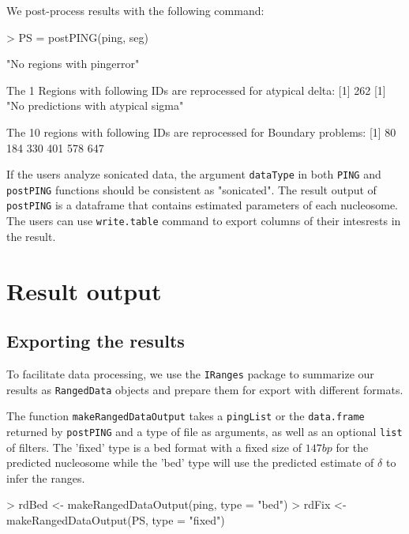 \documentclass[11pt]{article}
\begin{document}
We post-process results with the following command:


\begin{Schunk}
\begin{Sinput}
> PS = postPING(ping, seg)
\end{Sinput}
\begin{Soutput}
[1] "No regions with pingerror"

 The 1 Regions with following IDs are reprocessed for atypical delta: 
[1] 262
[1] "No predictions with atypical sigma"

 The 10 regions with following IDs are reprocessed for Boundary problems: 
[1]  80 184 330 401 578 647
\end{Soutput}
\end{Schunk}
If the users analyze sonicated data, the argument \texttt{dataType} in both \texttt{PING} and \texttt{postPING} functions should be consistent as "sonicated".
The result output of \texttt{postPING} is a dataframe that contains estimated parameters of each nucleosome. The users can use \texttt{write.table} command to export columns of their intesrests in the result. 



\section{Result output}

\subsection{Exporting the results}
To facilitate data processing, we use the \texttt{IRanges} package to summarize our results as \texttt{RangedData} objects and prepare them for export with different formats.


The function \texttt{makeRangedDataOutput} takes a \texttt{pingList} or the \texttt{data.frame} returned by \texttt{postPING} and a type of file as arguments, as well as an optional \texttt{list} of filters. The 'fixed' type is a bed format with a fixed size of $147bp$ for the predicted nucleosome while the 'bed' type will use the predicted estimate of $\delta$ to infer the ranges.
\begin{Schunk}
\begin{Sinput}
> rdBed <- makeRangedDataOutput(ping, type = "bed")
> rdFix <- makeRangedDataOutput(PS, type = "fixed")
\end{Sinput}
\end{Schunk}
\end{document}
